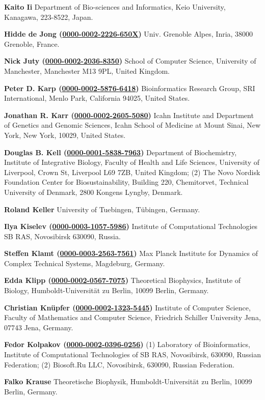 \documentclass{sbml-paper}
\newcommand{\orcid}[1]{\href{https://orcid.org/#1}{#1}}
\begin{document}
\textbf{Kaito Ii} Department of Bio-sciences and Informatics, Keio University, Kanagawa, 223-8522, Japan.

\textbf{Hidde de Jong (\orcid{0000-0002-2226-650X})} Univ. Grenoble Alpes, Inria, 38000 Grenoble, France.

\textbf{Nick Juty (\orcid{0000-0002-2036-8350})} School of Computer Science, University of Manchester, Manchester M13 9PL, United Kingdom.

\textbf{Peter D. Karp (\orcid{0000-0002-5876-6418})} Bioinformatics Research Group, SRI International, Menlo Park, California 94025, United States.

\textbf{Jonathan R. Karr (\orcid{0000-0002-2605-5080})} Icahn Institute and Department of Genetics and Genomic Sciences, Icahn School of Medicine at Mount Sinai, New York, New York, 10029, United States.

\textbf{Douglas B. Kell (\orcid{0000-0001-5838-7963})} Department of Biochemistry, Institute of Integrative Biology, Faculty of Health and Life Sciences, University of Liverpool, Crown St, Liverpool L69 7ZB, United Kingdom; (2) The Novo Nordisk Foundation Center for Biosustainability, Building 220, Chemitorvet, Technical University of Denmark, 2800 Kongens Lyngby, Denmark.

\textbf{Roland Keller} University of Tuebingen, Tübingen, Germany.

\textbf{Ilya Kiselev (\orcid{0000-0003-1057-5986})} Institute of Computational Technologies SB RAS, Novosibirsk 630090, Russia.

\textbf{Steffen Klamt (\orcid{0000-0003-2563-7561})} Max Planck Institute for Dynamics of Complex Technical Systems, Magdeburg, Germany.

\textbf{Edda Klipp (\orcid{0000-0002-0567-7075})} Theoretical Biophysics, Institute of Biology, Humboldt-Universität zu Berlin, 10099 Berlin, Germany.

\textbf{Christian Knüpfer (\orcid{0000-0002-1323-5445})} Institute of Computer Science, Faculty of Mathematics and Computer Science, Friedrich Schiller University Jena, 07743 Jena, Germany.

\textbf{Fedor Kolpakov (\orcid{0000-0002-0396-0256})} (1) Laboratory of Bioinformatics, Institute of Computational Technologies of SB RAS, Novosibirsk, 630090, Russian Federation; (2) Biosoft.Ru LLC, Novosibirsk, 630090, Russian Federation.

\textbf{Falko Krause} Theoretische Biophysik, Humboldt-Universität zu Berlin, 10099 Berlin, Germany.
\end{document}
